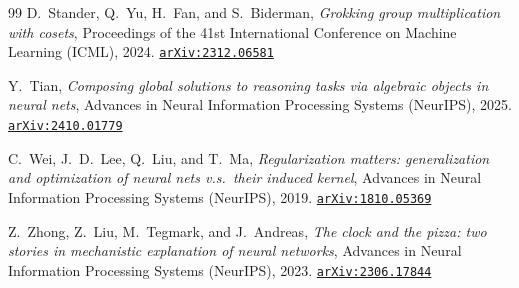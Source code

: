 \documentclass[11pt]{amsart}
\newcommand{\arxiv}[1]{\href{https://arxiv.org/abs/#1}{\texttt{arXiv:#1}}}
\theoremstyle{plain}
\theoremstyle{definition}
\begin{document}
\begin{thebibliography}{99}
D.~Stander, Q.~Yu, H.~Fan, and S.~Biderman,
\emph{Grokking group multiplication with cosets},
Proceedings of the 41st International Conference on Machine Learning (ICML), 2024.
\arxiv{2312.06581}

Y.~Tian,
\emph{Composing global solutions to reasoning tasks via algebraic objects in neural nets},
Advances in Neural Information Processing Systems (NeurIPS), 2025.
\arxiv{2410.01779}

C.~Wei, J.~D.~Lee, Q.~Liu, and T.~Ma,
\emph{Regularization matters: generalization and optimization of neural nets v.s.\ their induced kernel},
Advances in Neural Information Processing Systems (NeurIPS), 2019.
\arxiv{1810.05369}

Z.~Zhong, Z.~Liu, M.~Tegmark, and J.~Andreas,
\emph{The clock and the pizza: two stories in mechanistic explanation of neural networks},
Advances in Neural Information Processing Systems (NeurIPS), 2023.
\arxiv{2306.17844}

\end{thebibliography}
\end{document}
